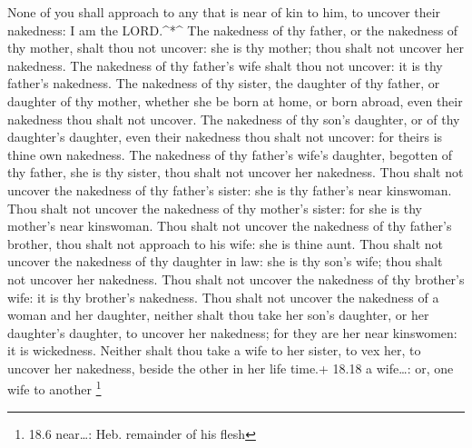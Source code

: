  None of you shall approach to any that is near of kin to
him, to uncover their nakedness: I am the LORD.\^{}*\^{} 
The nakedness of thy father, or the nakedness of thy mother, shalt thou
not uncover: she is thy mother; thou shalt not uncover her nakedness.
 The nakedness of thy father's wife shalt thou not uncover:
it is thy father's nakedness.  The nakedness of thy sister,
the daughter of thy father, or daughter of thy mother, whether she be
born at home, or born abroad, even their nakedness thou shalt not
uncover.  The nakedness of thy son's daughter, or of thy
daughter's daughter, even their nakedness thou shalt not uncover: for
theirs is thine own nakedness.  The nakedness of thy
father's wife's daughter, begotten of thy father, she is thy sister,
thou shalt not uncover her nakedness.  Thou shalt not
uncover the nakedness of thy father's sister: she is thy father's near
kinswoman.  Thou shalt not uncover the nakedness of thy
mother's sister: for she is thy mother's near kinswoman. 
Thou shalt not uncover the nakedness of thy father's brother, thou shalt
not approach to his wife: she is thine aunt.  Thou shalt
not uncover the nakedness of thy daughter in law: she is thy son's wife;
thou shalt not uncover her nakedness.  Thou shalt not
uncover the nakedness of thy brother's wife: it is thy brother's
nakedness.  Thou shalt not uncover the nakedness of a woman
and her daughter, neither shalt thou take her son's daughter, or her
daughter's daughter, to uncover her nakedness; for they are her near
kinswomen: it is wickedness.  Neither shalt thou take a
wife to her sister, to vex her, to uncover her nakedness, beside the
other in her life time.+ 18.18 a wife\ldots: or, one wife to another
\footnote{18.6 near\ldots: Heb. remainder of his flesh}

